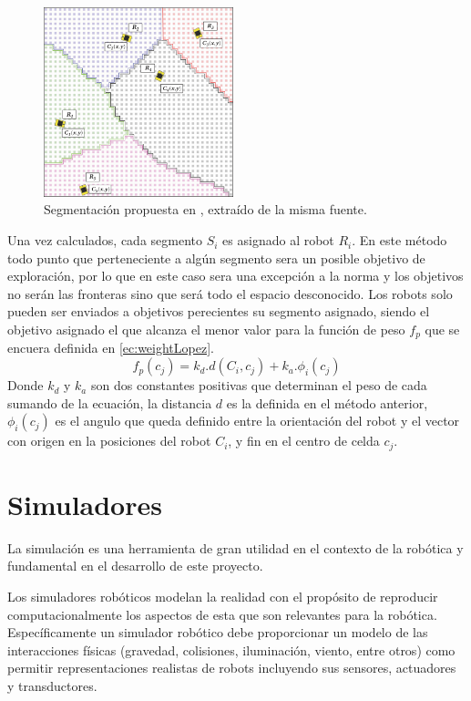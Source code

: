 \begin{figure}[H]
  \center
  \includegraphics[width=5.5cm]{imagenes/centerCoord.png}
  \caption[Segmentación propuesta en \cite{Lopez-Perez2018}]{Segmentación propuesta en \cite{Lopez-Perez2018}, extraído de la misma fuente.}\label{fig:ejemploCoordCenter}
\end{figure} 

Una vez calculados, cada segmento $S_i$ es asignado al robot $R_i$. En este método todo punto que perteneciente a algún segmento sera un posible objetivo de exploración, por lo que en este caso sera una excepción a la norma y los objetivos no serán las fronteras sino que será todo el espacio desconocido. Los robots solo pueden ser enviados a objetivos perecientes su segmento asignado, siendo el objetivo asignado el que alcanza el menor valor para la función de peso $f_p$ que se encuera definida en \eqref{ec:weightLopez}.
\begin{equation}\label{ec:weightLopez}
  f_p(c_j) = k_d.d(C_i,c_j) + k_a.\phi_i(c_j)
\end{equation}
Donde $k_d$ y $k_a$ son dos constantes positivas que determinan el peso de cada sumando de la ecuación, la distancia $d$ es la definida en el método anterior, $\phi_i(c_j)$ es el angulo que queda definido entre la orientación del robot y el vector con origen en la posiciones del robot $C_i$, y fin en el centro de celda $c_j$. 

\section{Simuladores}\label{sec:sim}


La simulación es una herramienta de gran utilidad en el contexto de la robótica
y fundamental en el desarrollo de este proyecto. 

Los simuladores robóticos modelan la realidad con el propósito de %
reproducir computacionalmente los aspectos de esta que son relevantes para la
robótica. Específicamente un simulador robótico debe proporcionar un modelo de
las interacciones físicas (gravedad, colisiones, iluminación, viento, entre
otros) como permitir representaciones realistas de robots incluyendo sus
sensores, actuadores y transductores.

